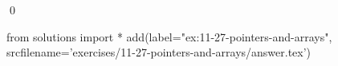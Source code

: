 
\begin{ex}
  \label{ex:11-27-pointers-and-arrays}
  
  \qed
\end{ex}
\begin{python0}
from solutions import *
add(label="ex:11-27-pointers-and-arrays",
    srcfilename='exercises/11-27-pointers-and-arrays/answer.tex')
\end{python0}
